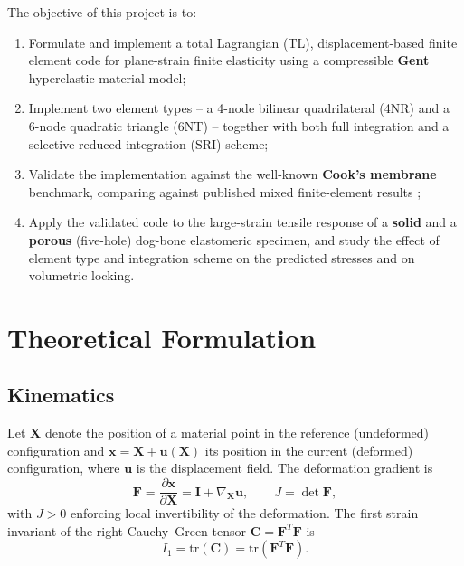 \documentclass[11pt,a4paper]{article}
\newcommand{\bF}{\mathbf{F}}
\newcommand{\bC}{\mathbf{C}}
\newcommand{\bI}{\mathbf{I}}
\begin{document}
The objective of this project is to:
\begin{enumerate}[label=(\roman*)]
    \item Formulate and implement a total Lagrangian (TL), displacement-based finite element code for
    plane-strain finite elasticity using a compressible \textbf{Gent} hyperelastic material model;
    \item Implement two element types -- a 4-node bilinear quadrilateral (4NR) and a 6-node quadratic
    triangle (6NT) -- together with both full integration and a selective reduced integration (SRI)
    scheme;
    \item Validate the implementation against the well-known \textbf{Cook's membrane} benchmark, comparing
    against published mixed finite-element results \cite{brinkstein1996};
    \item Apply the validated code to the large-strain tensile response of a \textbf{solid} and a
    \textbf{porous} (five-hole) dog-bone elastomeric specimen, and study the effect of element type and
    integration scheme on the predicted stresses and on volumetric locking.
\end{enumerate}

\section{Theoretical Formulation}

\subsection{Kinematics}
Let $\mathbf{X}$ denote the position of a material point in the reference (undeformed) configuration and
$\mathbf{x}=\mathbf{X}+\mathbf{u}(\mathbf{X})$ its position in the current (deformed) configuration, where
$\mathbf{u}$ is the displacement field. The deformation gradient is
\begin{equation}
\bF = \frac{\partial \mathbf{x}}{\partial \mathbf{X}} = \bI + \nabla_{\mathbf X}\mathbf{u},
\qquad J = \det \bF,
\end{equation}
with $J>0$ enforcing local invertibility of the deformation. The first strain invariant of the right
Cauchy--Green tensor $\bC = \bF^{T}\bF$ is
\begin{equation}
I_1 = \mathrm{tr}(\bC) = \mathrm{tr}(\bF^{T}\bF).
\end{equation}
\end{document}
